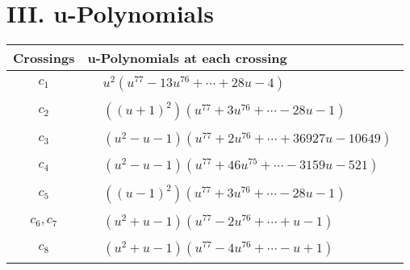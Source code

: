\documentclass[1p]{elsarticle_modified}
\theoremstyle{definition}
\begin{document}
\centering \section*{ III. u-Polynomials}
\begin{tabular}{m{50pt}|m{274pt}}
Crossings & \hspace{64pt}u-Polynomials at each crossing \\
\hline $$\begin{aligned}c_{1}\end{aligned}$$&$\begin{aligned}
&u^2(u^{77}-13 u^{76}+\cdots+28 u-4)
\end{aligned}$\\
\hline $$\begin{aligned}c_{2}\end{aligned}$$&$\begin{aligned}
&((u+1)^2)(u^{77}+3 u^{76}+\cdots-28 u-1)
\end{aligned}$\\
\hline $$\begin{aligned}c_{3}\end{aligned}$$&$\begin{aligned}
&(u^2- u-1)(u^{77}+2 u^{76}+\cdots+36927 u-10649)
\end{aligned}$\\
\hline $$\begin{aligned}c_{4}\end{aligned}$$&$\begin{aligned}
&(u^2- u-1)(u^{77}+46 u^{75}+\cdots-3159 u-521)
\end{aligned}$\\
\hline $$\begin{aligned}c_{5}\end{aligned}$$&$\begin{aligned}
&((u-1)^2)(u^{77}+3 u^{76}+\cdots-28 u-1)
\end{aligned}$\\
\hline $$\begin{aligned}c_{6},c_{7}\end{aligned}$$&$\begin{aligned}
&(u^2+u-1)(u^{77}-2 u^{76}+\cdots+u-1)
\end{aligned}$\\
\hline $$\begin{aligned}c_{8}\end{aligned}$$&$\begin{aligned}
&(u^2+u-1)(u^{77}-4 u^{76}+\cdots- u+1)
\end{aligned}$\\

\end{tabular}
\end{document}
